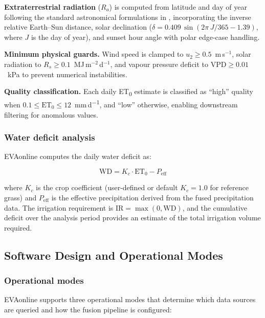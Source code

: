 \documentclass[preprint,review,12pt]{elsarticle}
\begin{document}
\textbf{Extraterrestrial radiation} ($R_a$) is computed from latitude and day
of year following the standard astronomical formulations in
\citet{Allen1998}, incorporating the inverse relative Earth--Sun distance,
solar declination ($\delta = 0.409\,\sin(2\pi\,J/365 - 1.39)$, where $J$ is
the day of year), and sunset hour angle with polar edge-case handling.

\textbf{Minimum physical guards.} Wind speed is clamped to $u_2 \geq 0.5$~m\,s$^{-1}$,
solar radiation to $R_s \geq 0.1$~MJ\,m$^{-2}$\,d$^{-1}$, and vapour pressure
deficit to $\text{VPD} \geq 0.01$~kPa to prevent numerical instabilities.

\textbf{Quality classification.} Each daily ET\textsubscript{0} estimate is
classified as ``high'' quality when $0.1 \leq \text{ET}_0 \leq 12$~mm\,d\textsuperscript{$-1$},
and ``low'' otherwise, enabling downstream filtering for anomalous values.

\subsubsection*{Water deficit analysis}

EVAonline computes the daily water deficit as:

\begin{equation}
\text{WD} = K_c \cdot \text{ET}_0 - P_{\text{eff}}
\label{eq:water_deficit}
\end{equation}

\noindent where $K_c$ is the crop coefficient (user-defined or default
$K_c = 1.0$ for reference grass) and $P_{\text{eff}}$ is the effective
precipitation derived from the fused precipitation data. The irrigation
requirement is $\text{IR} = \max(0, \text{WD})$, and the cumulative deficit
over the analysis period provides an estimate of the total irrigation volume
required.


\subsection{Software Design and Operational Modes}
\label{subsec:software}

\subsubsection*{Operational modes}

EVAonline supports three operational modes that determine which data sources
are queried and how the fusion pipeline is configured:
\end{document}
